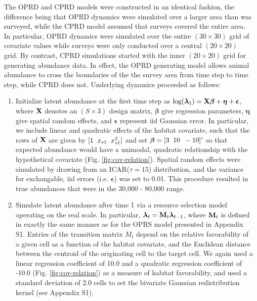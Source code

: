 \documentclass[12pt,fleqn]{article}
\begin{document}
\begin{flushleft}
\hspace{.5in} The OPRD and CPRD models were constructed in an identical fashion, the difference being that OPRD dynamics were simulated over a larger area than was surveyed, while the CPRD model assumed that surveys covered the entire area.  In particular, OPRD dynamics were simulated over the entire $(30 \times 30)$ grid of covariate values while surveys were only conducted over a central $(20 \times 20)$ grid.  By contrast, CPRD simulations started with the inner $(20 \times 20)$ grid for generating abundance data.  In effect, the OPRD generating model allows animal abundance to cross the boundaries of the the survey area from time step to time step, while CPRD does not.  Underlying dynamics proceeded as follows:
\begin{enumerate}
\renewcommand{\theenumi}{\Alph{enumi}} %
  \item Initialize latent abundance at the first time step as
   $\log(\boldsymbol{\lambda}_1) = {\bf X} \boldsymbol{\beta} + \boldsymbol{\eta} + \boldsymbol{\epsilon}$,
   where ${\bf X}$ denotes an $(S \times 3)$ design matrix, $\boldsymbol{\beta}$ give regression parameters, $\boldsymbol{\eta}$ give spatial random effects, and $\boldsymbol{\epsilon}$ represent iid Gaussian error.  In particular, we include linear and quadratic effects of the habitat covariate, such that the rows of ${\bf X}$ are given by $[1 \hspace{2mm} x_{s1} \hspace{2mm} x_{s1}^2]$ and set $\boldsymbol{\beta} = [3 \hspace{2mm} 10 \hspace{2mm} -10]^\prime$ so that expected abundance would have a unimodal, quadratic relationship with the hypothetical covariate (Fig. \ref{fig:cov-relation}).  Spatial random effects were simulated by drawing from an ICAR($\tau=15$) distribution, and the variance for exchangable, iid errors (i.e. $\boldsymbol{\epsilon}$) was set to 0.01. This procedure resulted in true abundances that were in the 30,000 - 80,000 range.\\
  \item Simulate latent abundance after time 1 via a resource selection model operating on the real scale.  In particular, $\boldsymbol{\lambda}_t = {\bf M}_t \boldsymbol{\lambda}_{t-1}$, where ${\bf M}_t$ is defined in exactly the same manner as for the OPRS model presented in Appendix S1.  Entries of the transition matrix $M_t$ depend on the relative favorability of a given cell as a function of the habitat covariate, and the Euclidean distance between the centroid of the originating cell to the target cell. We again used a linear regression coefficient of 10.0 and a quadratic regression coefficient of -10.0 (Fig. \ref{fig:cov-relation}) as a measure of habitat favorability, and used a standard deviation of 2.0 cells to set the bivariate Gaussian redistribution kernel (see Appendix S1).

\end{enumerate}
\end{flushleft}
\end{document}

